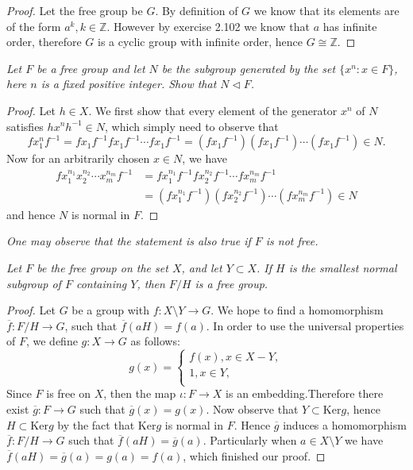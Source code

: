 \begin{proof}
Let the free group be $G$. By definition of $G$ we know that its elements are of the form $a^k,k\in\mathbb{Z}$. However by exercise 2.102 we know that $a$ has infinite order, therefore $G$ is a cyclic group with infinite order, hence $G\cong\mathbb{Z}$.
\end{proof}
\begin{problem}\em
Let $F$ be a free group and let $N$ be the subgroup generated by the set $\{x^n:x\in F\}$, here $n$ is a fixed positive integer. Show that $N\lhd F$.
\end{problem}
\begin{proof}
Let $h\in X$. We first show that every element of the generator $x^n$ of $N$ satisfies $hx^nh^{-1}\in N$, which simply need to observe that 
$$
fx_{1}^{n}f^{-1}=fx_1f^{-1}fx_1f^{-1}\cdots fx_1f^{-1}=\left( fx_1f^{-1} \right) \left( fx_1f^{-1} \right) \cdots \left( fx_1f^{-1} \right) \in N.
$$
Now for an arbitrarily chosen $x\in N$, we have 
$$
\begin{aligned}
fx_{1}^{n_1}x_{2}^{n_2}\cdots x_{m}^{n_m}f^{-1}&=fx_{1}^{n_1}f^{-1}fx_{2}^{n_2}f^{-1}\cdots fx_{m}^{n_m}f^{-1}\\
&=\left( fx_{1}^{n_1}f^{-1} \right) \left( fx_{2}^{n_2}f^{-1} \right) \cdots \left( fx_{m}^{n_m}f^{-1} \right) \in N
\end{aligned}
$$
and hence $N$ is normal in $F$.
\end{proof}
\begin{note}\em
One may observe that the statement is also true if $F$ is not free.    
\end{note}
\begin{problem}\em
Let $F$ be the free group on the set $X$, and let $Y\subset X$. If $H$ is the smallest normal subgroup of $F$ containing $Y$, then $F/H$ is a free group.
\end{problem}
\begin{proof}
Let $G$ be a group with $f:X\setminus Y\to G$. We hope to find a homomorphism $\overline{f}:F/H\to G$, such that $\overline{f}(aH)=f(a)$. In order to use the universal properties of $F$, we define $g:X\to G$ as follows:
$$
g\left( x \right) =\begin{cases}
	f\left( x \right) ,x\in X-Y,\\
	1,x\in Y,\\
\end{cases}
$$
Since $F$ is free on $X$, then the map $\iota:F\to X$ is an embedding.Therefore there exist $\overline{g}:F\to G$ such that $\overline{g}(x)=g(x)$. Now observe that $Y\subset\mathrm{Ker}g$, hence $H\subset\mathrm{Ker}g$ by the fact that $\mathrm{Ker}g$ is normal in $F$. Hence $\overline{g}$ induces a homomorphism $\overline{f}:F/H\to G$ such that $\overline{f}(aH)=\overline{g}(a)$. Particularly when $a\in X\setminus Y$ we have $\overline{f}\left( aH \right) =\overline{g}\left( a \right) =g\left( a \right) =f\left( a \right) $, which finished our proof.
\end{proof}
